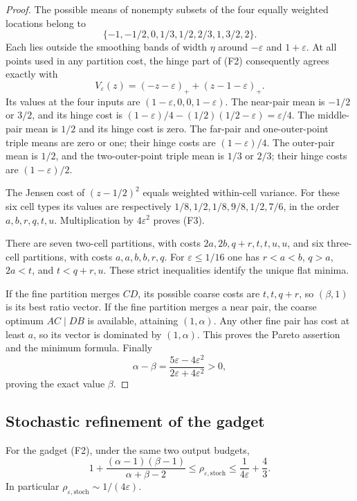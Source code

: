 \begin{proof}
The possible means of nonempty subsets of the four equally weighted
locations belong to
\[
 \{-1,-1/2,0,1/3,1/2,2/3,1,3/2,2\}.
\]
Each lies outside the smoothing bands of width $\eta$ around
$-\varepsilon$ and $1+\varepsilon$.  At all points used in any
partition cost, the hinge part of (F2) consequently agrees exactly with
\[
 V_\varepsilon(z)=(-z-\varepsilon)_+
                         +(z-1-\varepsilon)_+.
\]
Its values at the four inputs are $(1-\varepsilon,0,0,1-\varepsilon)$.
The near-pair mean is $-1/2$ or $3/2$, and its hinge cost is
$(1-\varepsilon)/4-(1/2)(1/2-\varepsilon)=\varepsilon/4$.
The middle-pair mean is $1/2$ and its hinge cost is zero.
The far-pair and one-outer-point triple means are zero or one; their
hinge costs are $(1-\varepsilon)/4$.  The outer-pair mean is $1/2$,
and the two-outer-point triple mean is $1/3$ or $2/3$; their hinge costs
are $(1-\varepsilon)/2$.

The Jensen cost of $(z-1/2)^2$ equals weighted within-cell variance.
For these six cell types its values are respectively
$1/8,1/2,1/8,9/8,1/2,7/6$, in the order $a,b,r,q,t,u$.
Multiplication by $4\varepsilon^2$ proves (F3).

There are seven two-cell partitions, with costs
$2a,2b,q+r,t,t,u,u$, and six three-cell partitions, with costs
$a,a,b,b,r,q$.  For $\varepsilon\leq1/16$ one has
$r<a<b$, $q>a$, $2a<t$, and $t<q+r,u$.
These strict inequalities identify the unique flat minima.

If the fine partition merges $CD$, its possible coarse costs are
$t,t,q+r$, so $(\beta,1)$ is its best ratio vector.  If the fine
partition merges a near pair, the coarse optimum $AC\mid DB$ is
available, attaining $(1,\alpha)$.  Any other fine pair has cost
at least $a$, so its vector is dominated by $(1,\alpha)$.
This proves the Pareto assertion and the minimum formula.  Finally
\[
 \alpha-\beta
 =\frac{5\varepsilon-4\varepsilon^2}
          {2\varepsilon+4\varepsilon^2}>0,
\]
proving the exact value $\beta$.
\end{proof}

\subsection{Stochastic refinement of the gadget}

\begin{lemma}
\label{lem:equal-mass-stochastic}
For the gadget (F2), under the same two output budgets,
\[
 1+\frac{(\alpha-1)(\beta-1)}{\alpha+\beta-2}
 \leq\rho_{\varepsilon,\mathrm{stoch}}
 \leq\frac1{4\varepsilon}+\frac43.
 \tag{F5}\label{eq:gadget-stochastic-bracket}
\]
In particular $\rho_{\varepsilon,\mathrm{stoch}}
\sim1/(4\varepsilon)$.
\end{lemma}

